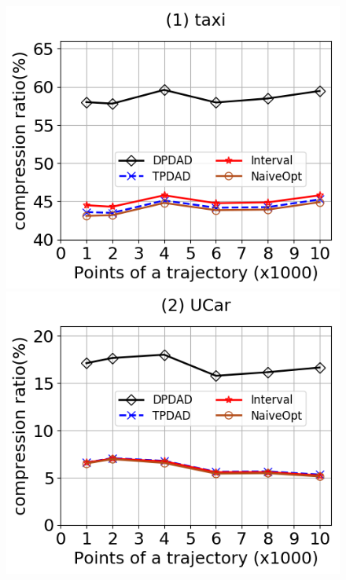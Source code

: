 \begin{figure}[tb!]
	\centering
	\includegraphics[scale=0.315]{Figures/Exp-DAD-CR-size-taxi.png}\hspace{1ex}
	\includegraphics[scale=0.315]{Figures/Exp-DAD-CR-size-service.png} 	\hspace{1ex}

\end{figure}

